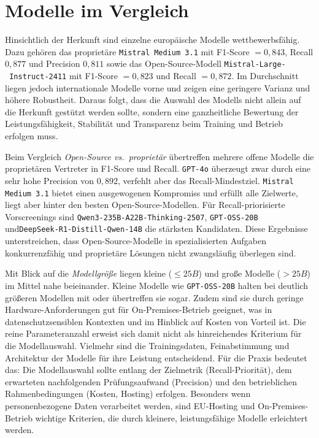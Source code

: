 \section{Modelle im Vergleich}\label{sec:modelle-im-vergleich}

Hinsichtlich der Herkunft sind einzelne europäische Modelle wettbewerbsfähig. Dazu gehören das proprietäre \texttt{Mistral Medium 3.1} mit F1-Score $= 0{,}843$, Recall $0{,}877$ und Precision $0{,}811$ sowie das Open-Source-Modell \texttt{Mistral-Large-\linebreak~Instruct-2411} mit F1-Score $= 0{,}823$ und Recall $= 0{,}872$. Im Durchschnitt liegen jedoch internationale Modelle vorne und zeigen eine geringere Varianz und höhere Robustheit. Daraus folgt, dass die Auswahl des Modells nicht allein auf die Herkunft gestützt werden sollte, sondern eine ganzheitliche Bewertung der Leistungsfähigkeit, Stabilität und Transparenz beim Training und Betrieb erfolgen muss.

Beim Vergleich \emph{Open-Source vs.\ proprietär} übertreffen mehrere offene Modelle die proprietären Vertreter in F1-Score und Recall. \texttt{GPT-4o} überzeugt zwar durch eine sehr hohe Precision von $0{,}892$, verfehlt aber das Recall-Mindestziel. \texttt{Mistral Medium 3.1} bietet einen ausgewogenen Kompromiss und erfüllt alle Zielwerte, liegt aber hinter den besten Open-Source-Modellen. Für Recall-priorisierte Vorscreenings sind \texttt{Qwen3-235B-A22B-Thinking-2507}, \texttt{GPT-OSS-20B} und\linebreak\texttt{DeepSeek-R1-Distill-Qwen-14B} die stärksten Kandidaten. Diese Ergebnisse unterstreichen, dass Open-Source-Modelle in spezialisierten Aufgaben konkurrenzfähig und proprietäre Lösungen nicht zwangsläufig überlegen sind.

Mit Blick auf die \emph{Modellgröße} liegen kleine ($\leq 25B$) und große Modelle ($> 25B$) im Mittel nahe beieinander. Kleine Modelle wie \texttt{GPT-OSS-20B} halten bei deutlich größeren Modellen mit oder übertreffen sie sogar. Zudem sind sie durch geringe Hardware-Anforderungen gut für On-Premises-Betrieb geeignet, was in datenschutzsensiblen Kontexten und im Hinblick auf Kosten von Vorteil ist. Die reine Parameteranzahl erweist sich damit nicht als hinreichendes Kriterium für die Modellauswahl. Vielmehr sind die Trainingsdaten, Feinabstimmung und Architektur der Modelle für ihre Leistung entscheidend. Für die Praxis bedeutet das: Die Modellauswahl sollte entlang der Zielmetrik (Recall-Priorität), dem erwarteten nachfolgenden Prüfungsaufwand (Precision) und den betrieblichen Rahmenbedingungen (Kosten, Hosting) erfolgen. Besonders wenn personenbezogene Daten verarbeitet werden, sind \ac{EU}-Hosting und On-Premises-Betrieb wichtige Kriterien, die durch kleinere, leistungsfähige Modelle erleichtert werden.
